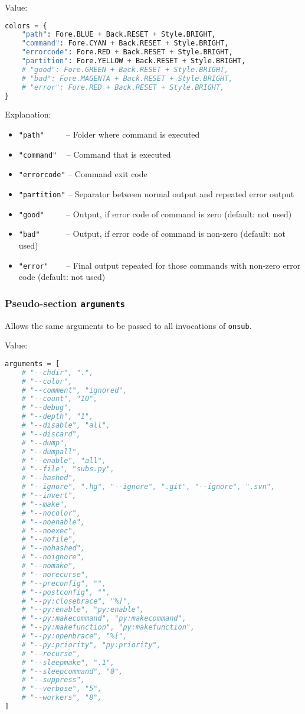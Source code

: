 Value:

\begin{snugshade}
\begin{lstlisting}[language=python]
colors = {
	"path": Fore.BLUE + Back.RESET + Style.BRIGHT,
	"command": Fore.CYAN + Back.RESET + Style.BRIGHT,
	"errorcode": Fore.RED + Back.RESET + Style.BRIGHT,
	"partition": Fore.YELLOW + Back.RESET + Style.BRIGHT,
	# "good": Fore.GREEN + Back.RESET + Style.BRIGHT,
	# "bad": Fore.MAGENTA + Back.RESET + Style.BRIGHT,
	# "error": Fore.RED + Back.RESET + Style.BRIGHT,
}
\end{lstlisting}
\end{snugshade}

Explanation:

\begin{itemize}
\item \lstinline{"path"} ~~~~ -- Folder where command is executed
\item \lstinline{"command"} ~ -- Command that is executed
\item \lstinline{"errorcode"} -- Command exit code
\item \lstinline{"partition"} -- Separator between normal output and repeated error output
\item \lstinline{"good"} ~~~~ -- Output, if error code of command is zero (default: not used)
\item \lstinline{"bad"} ~~~~~ -- Output, if error code of command is non-zero (default: not used)
\item \lstinline{"error"} ~~~ -- Final output repeated for those commands with non-zero error code (default: not used)
\end{itemize}

\subsubsection{Pseudo-section \lstinline{arguments}}
Allows the same arguments to be passed to all invocations of \lstinline{onsub}.

Value:

\begin{snugshade}
\begin{lstlisting}[language=python]
arguments = [
	# "--chdir", ".",
	# "--color",
	# "--comment", "ignored",
	# "--count", "10",
	# "--debug",
	# "--depth", "1",
	# "--disable", "all",
	# "--discard",
	# "--dump",
	# "--dumpall",
	# "--enable", "all",
	# "--file", "subs.py",
	# "--hashed",
	# "--ignore", ".hg", "--ignore", ".git", "--ignore", ".svn",
	# "--invert",
	# "--make",
	# "--nocolor",
	# "--noenable",
	# "--noexec",
	# "--nofile",
	# "--nohashed",
	# "--noignore",
	# "--nomake",
	# "--norecurse",
	# "--preconfig", "",
	# "--postconfig", "",
	# "--py:closebrace", "%]",
	# "--py:enable", "py:enable",
	# "--py:makecommand", "py:makecommand",
	# "--py:makefunction", "py:makefunction",
	# "--py:openbrace", "%[",
	# "--py:priority", "py:priority",
	# "--recurse",
	# "--sleepmake", ".1",
	# "--sleepcommand", "0",
	# "--suppress",
	# "--verbose", "5",
	# "--workers", "8",
]
\end{lstlisting}
\end{snugshade}

